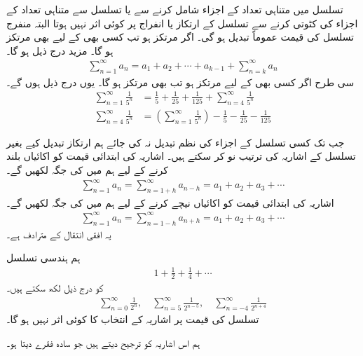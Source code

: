 تسلسل میں متناہی تعداد کے اجزاء شامل کرنے سے یا تسلسل سے متناہی تعداد کے اجزاء کی کٹوتی کرنے سے تسلسل کے ارتکاز یا انفراج پر کوئی اثر نہیں ہوتا  البتہ منفرج تسلسل کی قیمت عموماً تبدیل ہو گی۔  اگر  مرتکز ہو تب کسی بھی  کے لیے  بھی مرتکز ہو گا۔ مزید درج ذیل ہو گا۔
\begin{align}
\sum_{n=1}^{\infty}a_n=a_1+a_2+\cdots+a_{k-1}+\sum_{n=k}^{\infty}a_n
\end{align}
سی طرح اگر کسی بھی  کے لیے  مرتکز ہو تب  بھی مرتکز ہو گا۔ یوں درج ذیل ہوں گے۔
\begin{align}
\sum_{n=1}^{\infty}\frac{1}{5^n}&=\frac{1}{5}+\frac{1}{25}+\frac{1}{125}+\sum_{n=4}^{\infty}\frac{1}{5^n}\\
\sum_{n=4}^{\infty}\frac{1}{5^n}&=\left(\sum_{n=1}^{\infty}\frac{1}{5^n}\right)-\frac{1}{5}-\frac{1}{25}-\frac{1}{125}
\end{align}

جب تک کسی تسلسل کے اجزاء کی  نظم تبدیل نہ کی جائے ہم ارتکاز تبدیل کیے بغیر تسلسل کے اشاریہ کی ترتیب نو کر سکتے ہیں۔ اشاریہ کی ابتدائی قیمت کو  اکائیاں بلند کرنے کے لیے ہم  میں  کی جگہ  لکھیں گے۔
\begin{align*}
\sum_{n=1}^{\infty}a_n=\sum_{n=1+h}^{\infty}a_{n-h}=a_1+a_2+a_3+\cdots
\end{align*}
اشاریہ کی ابتدائی قیمت کو  اکائیاں نیچے کرنے کے لیے ہم  میں  کی جگہ  لکھیں گے۔
\begin{align*}
\sum_{n=1}^{\infty}a_n=\sum_{n=1-h}^{\infty}a_{n+h}=a_1+a_2+a_3+\cdots
\end{align*}
یہ افقی انتقال  کے مترادف ہے۔


ہم ہندسی تسلسل
\begin{align*}
1+\frac{1}{2}+\frac{1}{4}+\cdots
\end{align*}
کو درج ذیل لکھ سکتے ہیں۔
\begin{align*}
\sum_{n=0}^{\infty}\frac{1}{2^n},\quad \sum_{n=5}^{\infty}\frac{1}{2^{n-5}},\quad \sum_{n=-4}^{\infty}\frac{1}{2^{n+4}}
\end{align*}
تسلسل کی قیمت پر اشاریہ کے انتخاب کا کوئی اثر نہیں ہو گا۔

ہم اس اشاریہ کو ترجیح دیتے ہیں جو سادہ فقرے دیتا ہو۔
 

